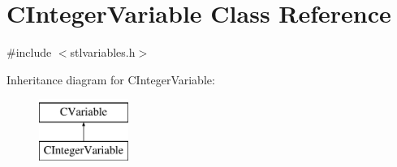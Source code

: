 \hypertarget{classCIntegerVariable}{\section{C\-Integer\-Variable Class Reference}
\label{classCIntegerVariable}
}


{\ttfamily \#include $<$stlvariables.\-h$>$}

Inheritance diagram for C\-Integer\-Variable\-:\begin{figure}[H]
\begin{center}
\leavevmode
\includegraphics[height=2.000000cm]{de/db5/classCIntegerVariable}
\end{center}
\end{figure}
